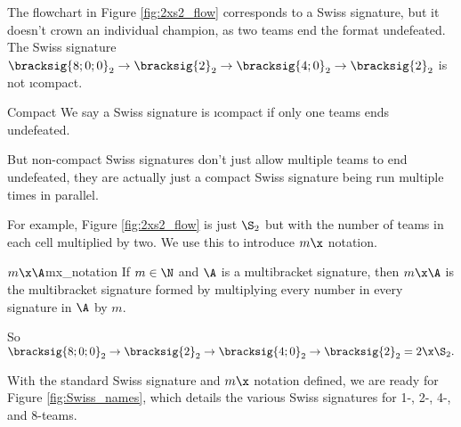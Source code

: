 {    %
    

    The flowchart in Figure \ref{fig:2xs2_flow} corresponds to a Swiss signature, but it doesn't crown an individual champion, as two teams end the format undefeated. The Swiss signature $\bracksig{8;0;0}_2 \to \bracksig{2}_2 \to \bracksig{4;0}_2 \to \bracksig{2}_2$ is not \i{compact}.

    \begin{definition}{Compact}{}
            We say a Swiss signature is \i{compact} if only one teams ends undefeated.
    \end{definition}

    But non-compact Swiss signatures don't just allow multiple teams to end undefeated, they are actually just a compact Swiss signature being run multiple times in parallel.


    For example, Figure \ref{fig:2xs2_flow} is just $\S_2$ but with the number of teams in each cell multiplied by two. We use this to introduce $m\x$ notation.

   \begin{definition}{$m\x\A$}{mx_notation}
        If $m \in \N$ and $\A$ is a multibracket signature, then $m\x\A$ is the multibracket signature formed by multiplying every number in every signature in $\A$ by $m$.
    \end{definition}

    So $\bracksig{8;0;0}_2 \to \bracksig{2}_2 \to \bracksig{4;0}_2 \to \bracksig{2}_2 = 2\x\S_2.$

    With the standard Swiss signature and $m\x$ notation defined, we are ready for Figure \ref{fig:Swiss_names}, which details the various Swiss signatures for 1-, 2-, 4-, and 8-teams.

}
